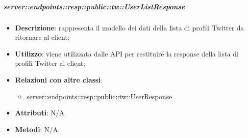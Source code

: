     \subparagraph{server::endpoints::resp::public::tw::UserListResponse} %
    \label{subp:bdsm_app_server_endpoints_resp_public_tw_userlistresponse}
    \begin{itemize}
      \item \textbf{Descrizione}: rappresenta il modello dei dati della lista di profili Twitter da ritornare al client;
      \item \textbf{Utilizzo}: viene utilizzata dalle API per restituire la response della lista di profili Twitter al client;
      \item \textbf{Relazioni con altre classi}:
        \begin{itemize}
          \item server::endpoints::resp::public::tw::UserResponse
        \end{itemize}
    \item \textbf{Attributi}: N/A
    \item \textbf{Metodi}: N/A
      \end{itemize}

